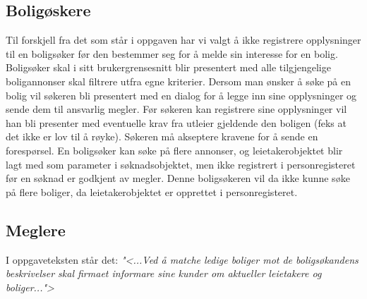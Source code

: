 \subsection{Boligøskere} \label{sec:sokere}
Til forskjell fra det som står i oppgaven har vi valgt å ikke registrere opplysninger til en boligsøker før den bestemmer seg for å melde sin interesse for en bolig. Boligsøker skal i sitt brukergrensesnitt blir presentert med alle tilgjengelige boligannonser skal filtrere utfra egne kriterier. Dersom man ønsker å søke på en bolig vil søkeren bli presentert med en dialog for å legge inn sine opplysninger og sende dem til ansvarlig megler. Før søkeren kan registrere sine opplysninger vil han bli presenter med eventuelle krav fra utleier gjeldende den boligen (feks at det ikke er lov til å røyke). Søkeren må akseptere kravene for å sende en forespørsel. En boligsøker kan søke på flere annonser, og leietakerobjektet blir lagt med som parameter i søknadsobjektet, men ikke registrert i personregisteret før en søknad er godkjent av megler. Denne boligsøkeren vil da ikke kunne søke på flere boliger, da leietakerobjektet er opprettet i personregisteret. 

\subsection{Meglere}
I oppgaveteksten står det:
\textit{"<...Ved å matche ledige boliger mot de boligsøkandens beskrivelser skal firmaet informare sine kunder om aktueller leietakere og boliger...">}

